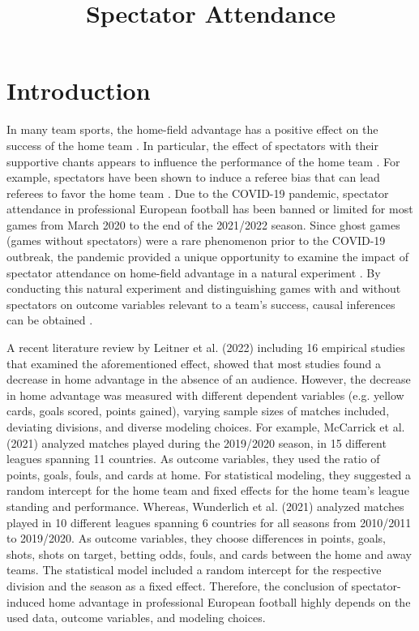\title{Spectator Attendance}
\label{Spectator_Attendance}

\section{Introduction}

In many team sports, the home-field advantage has a positive effect on the success of the home team \cite{cross2020fans, angelini2019efficiency, pollard2005long}. In particular, the effect of spectators with their supportive chants appears to influence the performance of the home team \cite{ponzo2018does}. For example, spectators have been shown to induce a referee bias that can lead referees to favor the home team \cite{dohmen2016referee, leitner2021no}. Due to the COVID-19 pandemic, spectator attendance in professional European football has been banned or limited for most games from March 2020 to the end of the 2021/2022 season. Since ghost games (games without spectators) were a rare phenomenon prior to the COVID-19 outbreak, the pandemic provided a unique opportunity to examine the impact of spectator attendance on home-field advantage in a natural experiment \cite{cueva2020animal}. By conducting this natural experiment and distinguishing games with and without spectators on outcome variables relevant to a team's success, causal inferences can be obtained \cite{jimenez2021home}.

A recent literature review by Leitner et al. (2022) \cite{leitner2022cauldron} including 16 empirical studies that examined the aforementioned effect, showed that most studies found a decrease in home advantage in the absence of an audience. However, the decrease in home advantage was measured with different dependent variables (e.g. yellow cards, goals scored, points gained), varying sample sizes of matches included, deviating divisions, and diverse modeling choices. For example, McCarrick et al. (2021) \cite{mccarrick2021home} analyzed matches played during the 2019/2020 season, in 15 different leagues spanning 11 countries. As outcome variables, they used the ratio of points, goals, fouls, and cards at home. For statistical modeling, they suggested a random intercept for the home team and fixed effects for the home team's league standing and performance. Whereas, Wunderlich et al. (2021) \cite{wunderlich2021does} analyzed matches played in 10 different leagues spanning 6 countries for all seasons from 2010/2011 to 2019/2020. As outcome variables, they choose differences in points, goals, shots, shots on target, betting odds, fouls, and cards between the home and away teams. The statistical model included a random intercept for the respective division and the season as a fixed effect. Therefore, the conclusion of spectator-induced home advantage in professional European football highly depends on the used data, outcome variables, and modeling choices.

